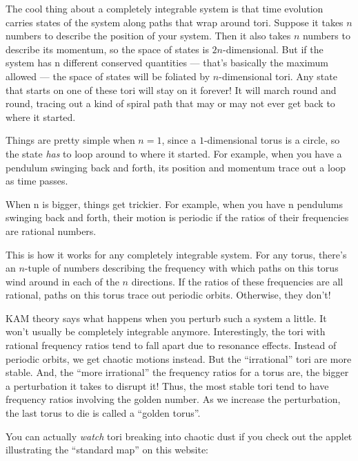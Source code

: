 \documentclass{article}
\def\tightlist{}
\renewcommand{\texttt}[1]{%
  \begingroup
  \ttfamily
  \begingroup\lccode`~=`/\lowercase{\endgroup\def~}{/\discretionary{}{}{}}%
  \begingroup\lccode`~=`[\lowercase{\endgroup\def~}{[\discretionary{}{}{}}%
  \begingroup\lccode`~=`.\lowercase{\endgroup\def~}{.\discretionary{}{}{}}%
  \catcode`/=\active\catcode`[=\active\catcode`.=\active
  \scantokens{#1\noexpand}%
  \endgroup
}
\begin{document}
The cool thing about a completely integrable system is that time
evolution carries states of the system along paths that wrap around
tori. Suppose it takes \(n\) numbers to describe the position of your
system. Then it also takes \(n\) numbers to describe its momentum, so
the space of states is \(2n\)-dimensional. But if the system has n
different conserved quantities --- that's basically the maximum allowed
--- the space of states will be foliated by \(n\)-dimensional tori. Any
state that starts on one of these tori will stay on it forever! It will
march round and round, tracing out a kind of spiral path that may or may
not ever get back to where it started.

Things are pretty simple when \(n = 1\), since a \(1\)-dimensional torus
is a circle, so the state \emph{has} to loop around to where it started.
For example, when you have a pendulum swinging back and forth, its
position and momentum trace out a loop as time passes.

When n is bigger, things get trickier. For example, when you have n
pendulums swinging back and forth, their motion is periodic if the
ratios of their frequencies are rational numbers.

This is how it works for any completely integrable system. For any
torus, there's an \(n\)-tuple of numbers describing the frequency with
which paths on this torus wind around in each of the \(n\) directions.
If the ratios of these frequencies are all rational, paths on this torus
trace out periodic orbits. Otherwise, they don't!

KAM theory says what happens when you perturb such a system a little. It
won't usually be completely integrable anymore. Interestingly, the tori
with rational frequency ratios tend to fall apart due to resonance
effects. Instead of periodic orbits, we get chaotic motions instead. But
the ``irrational'' tori are more stable. And, the ``more irrational''
the frequency ratios for a torus are, the bigger a perturbation it takes
to disrupt it! Thus, the most stable tori tend to have frequency ratios
involving the golden number. As we increase the perturbation, the last
torus to die is called a ``golden torus''.

You can actually \emph{watch} tori breaking into chaotic dust if you
check out the applet illustrating the ``standard map'' on this website:

\end{document}
